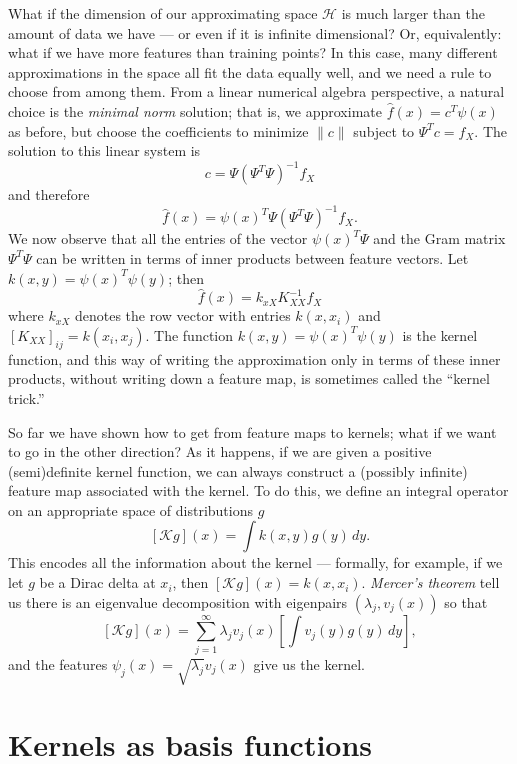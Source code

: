 \documentclass[12pt, leqno]{article} %
\begin{document}
What if the dimension of our approximating space $\mathcal{H}$ is much
larger than the amount of data we have --- or even if it is infinite
dimensional?  Or, equivalently: what if we have more features than
training points?  In this case, many different approximations in the
space all fit the data equally well, and we need a rule to choose from
among them.  From a linear numerical algebra perspective, a natural
choice is the {\em minimal norm} solution; that is, we
approximate $\hat{f}(x) = c^T \psi(x)$ as before, but choose the
coefficients to minimize $\|c\|$ subject to $\Psi^T c = f_X$.
The solution to this linear system is
\[
  c = \Psi (\Psi^T \Psi)^{-1} f_X
\]
and therefore
\[
  \hat{f}(x) = \psi(x)^T \Psi (\Psi^T \Psi)^{-1} f_X.
\]
We now observe that all the entries of the vector $\psi(x)^T \Psi$
and the Gram matrix $\Psi^T \Psi$ can be written in terms of inner
products between feature vectors.  Let $k(x,y) = \psi(x)^T \psi(y)$;
then
\[
  \hat{f}(x) = k_{xX} K_{XX}^{-1} f_X
\]
where $k_{xX}$ denotes the row vector with entries $k(x,x_i)$
and $[K_{XX}]_{ij} = k(x_i,x_j)$.
The function $k(x,y) = \psi(x)^T \psi(y)$ is the kernel function,
and this way of writing the approximation only in terms of
these inner products, without writing down a feature map, is
sometimes called the ``kernel trick.''

So far we have shown how to get from feature maps to kernels; what if
we want to go in the other direction?  As it happens, if we are given
a positive (semi)definite kernel function, we can always construct a
(possibly infinite) feature map associated with the kernel.  To do
this, we define an integral operator on an appropriate space of
distributions $g$
\[
  [\mathcal{K}g](x) = \int k(x,y) g(y) \, dy.
\]
This encodes all the information about the kernel --- formally, for
example, if we let $g$ be a Dirac delta at $x_i$, then
$[\mathcal{K}g](x) = k(x,x_i)$.
{\em Mercer's theorem} tell us there is an eigenvalue
decomposition with eigenpairs $(\lambda_j, v_j(x))$ so that
\[
  [\mathcal{K} g](x) =
  \sum_{j=1}^\infty \lambda_j v_j(x) \left[ \int v_j(y) g(y) \, dy \right],
\]
and the features $\psi_j(x) = \sqrt{\lambda_j} v_j(x)$ give us the kernel.

\section{Kernels as basis functions}
\end{document}
